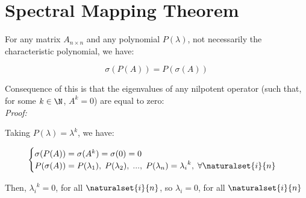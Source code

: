 \section*{Spectral Mapping Theorem}

For any matrix $A_{n \times n}$ and any polynomial $P(\lambda)$, not necessarily the characteristic polynomial, we have:

$$\sigma(P(A))=P(\sigma(A))$$

Consequence of this is that the eigenvalues of any nilpotent operator (such that, for some $k \in \N$, $A^k=0$) are equal to zero:\\

\textit{Proof:}

Taking $P(\lambda)=\lambda^k$, we have:

$$\begin{cases}
      \sigma(P(A))=\sigma(A^k)=\sigma(0)=0\\
      P(\sigma(A))=P(\lambda_1),\;P(\lambda_2),\;...,\;P(\lambda_n)={\lambda_i}^k,\;\forall \naturalset{i}{n}\\
\end{cases}$$

Then, ${\lambda_i}^k=0$, for all $\naturalset{i}{n}$, so ${\lambda_i}=0$, for all $\naturalset{i}{n}$